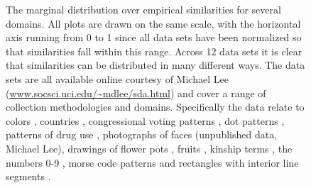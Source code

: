 \documentclass{apa}
\begin{document}

\begin{figure}[ph]
\begin{center}
\caption{The marginal distribution over empirical similarities for several domains. All plots are drawn on the same scale, with the horizontal axis running from 0 to 1  since all data sets have been normalized so that similarities fall within this range. Across 12 data sets it is clear that similarities can be distributed in many different ways. The data sets are all available online courtesy of Michael Lee (\protect\url{www.socsci.uci.edu/~mdlee/sda.html}) and cover a range of collection methodologies and domains. Specifically the data relate to colors \protect\cite{Ekman1954}, countries \protect\cite{Navarro2002}, congressional voting patterns \protect\cite{Romesburg1984}, dot patterns \protect\cite{Glushko1975}, patterns of drug use \protect\cite{Huba1981}, photographs of faces (unpublished data, Michael Lee), drawings of flower pots \protect\cite{Gati1982}, fruits \protect\cite{Tversky1986}, kinship terms \protect\cite{Rosenberg1975}, the numbers 0-9 \protect\cite{Shepard1975}, morse code patterns \protect\cite{Rothkopf1957} and rectangles with interior line segments \protect\cite{Kruschke1993}.}
\label{distributionofsimilarity}
\end{center}
\end{figure}
\end{document}
